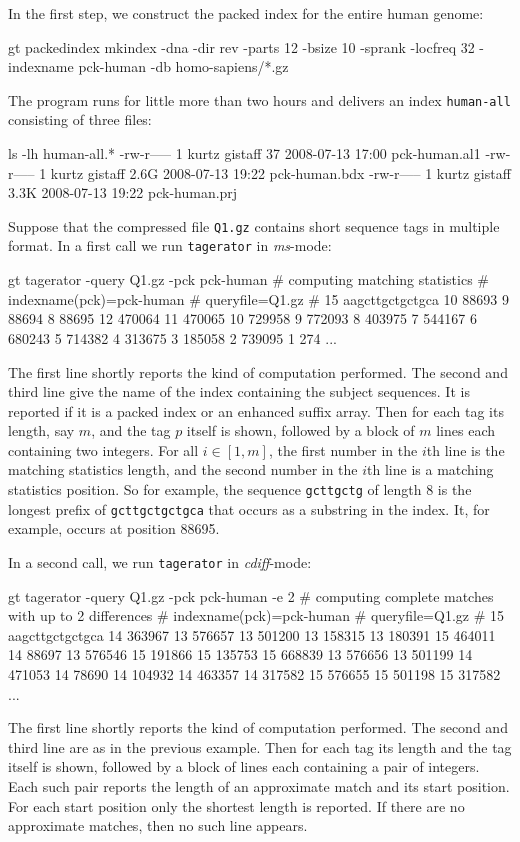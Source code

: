 \documentclass[12pt]{article}
\newcommand{\Program}[0]{\texttt{tagerator}\xspace}
\begin{document}
In the first step, we construct the packed index for the entire human genome:

\begin{Output}
gt packedindex mkindex -dna -dir rev -parts 12 -bsize 10 -sprank -locfreq 32
                       -indexname pck-human -db homo-sapiens/*.gz
\end{Output}

The program runs for little more than two hours and delivers 
an index \texttt{human-all} consisting of three files:

\begin{Output}
ls -lh human-all.*
-rw-r----- 1 kurtz gistaff   37 2008-07-13 17:00 pck-human.al1
-rw-r----- 1 kurtz gistaff 2.6G 2008-07-13 19:22 pck-human.bdx
-rw-r----- 1 kurtz gistaff 3.3K 2008-07-13 19:22 pck-human.prj
\end{Output}

Suppose that the compressed file \texttt{Q1.gz} contains short sequence tags
in multiple \Fasta format. In a first call we run \Program in \textit{ms}-mode:

\begin{Output}
gt tagerator -query Q1.gz -pck pck-human
# computing matching statistics
# indexname(pck)=pck-human
# queryfile=Q1.gz
# 15 aagcttgctgctgca
10 88693
9 88694
8 88695
12 470064
11 470065
10 729958
9 772093
8 403975
7 544167
6 680243
5 714382
4 313675
3 185058
2 739095
1 274
...
\end{Output}
The first line shortly reports the kind of computation performed. The second
and third line give the name of the index containing the subject sequences.
It is reported if it is a packed index or an enhanced suffix array. Then for
each tag its length, say \(m\), and the tag \(p\) itself is shown, followed by 
a block of \(m\) lines each containing two integers. For all \(i\in[1,m]\), 
the first number in the \(i\)th line is the matching statistics length,
and the second number in the \(i\)th line is a matching statistics position.
So for example, the sequence \texttt{gcttgctg} of length 8 is the longest 
prefix of \texttt{gcttgctgctgca} that occurs as a substring in the index.
It, for example, occurs at position 88695.

In a second call, we run \Program in \textit{cdiff}-mode:

\begin{Output}
gt tagerator -query Q1.gz -pck pck-human -e 2
# computing complete matches with up to 2 differences
# indexname(pck)=pck-human
# queryfile=Q1.gz
# 15 aagcttgctgctgca
14 363967
13 576657
13 501200
13 158315
13 180391
15 464011
14 88697
13 576546
15 191866
15 135753
15 668839
13 576656
13 501199
14 471053
14 78690
14 104932
14 463357
14 317582
15 576655
15 501198
15 317582
...
\end{Output}
The first line shortly reports the kind of computation performed. The second
and third line are as in the previous example. Then for
each tag its length and the tag itself is shown, followed by 
a block of lines each containing a pair of integers. Each such pair
reports the length of an approximate match and its start position. For each
start position only the shortest length is reported. If there are no
approximate matches, then no such line appears.
\end{document}
